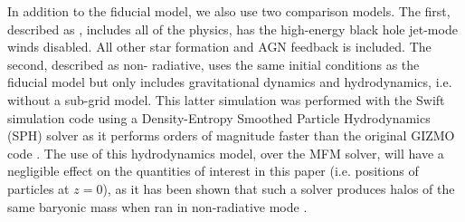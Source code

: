 In addition to the fiducial model, we also use two comparison models. The first, described as \nojet{}, includes all of the \simba{} physics, has the high-energy black hole jet-mode winds disabled.  All other star formation and AGN feedback is included.  The second, described as non-
radiative, uses the same initial conditions as the fiducial model but only
includes gravitational dynamics and hydrodynamics, i.e. without a sub-grid
model. This latter simulation was performed with the {\sc Swift} simulation
code \citep{Schaller2016} using a Density-Entropy Smoothed Particle
Hydrodynamics (SPH) solver as it performs orders of magnitude faster than the
original GIZMO code \citep{Borrow2018}. The use of this hydrodynamics model,
over the MFM solver, will have a negligible effect on the quantities of
interest in this paper (i.e. positions of particles at $z=0$), as it has been
shown that such a solver produces halos of the same baryonic mass when ran in
non-radiative mode \citep[see e.g.][]{Sembolini2016}.
